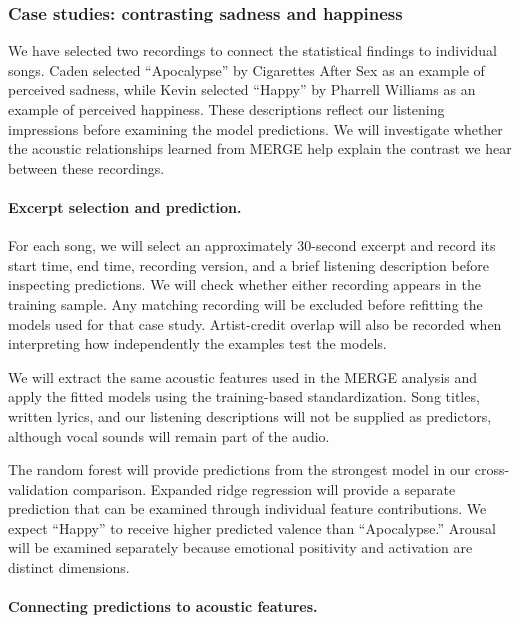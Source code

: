 \subsubsection{Case studies: contrasting sadness and happiness}
\label{sec:case_studies}

We have selected two recordings to connect the statistical findings to individual songs. Caden selected ``Apocalypse'' by Cigarettes After Sex as an example of perceived sadness, while Kevin selected ``Happy'' by Pharrell Williams as an example of perceived happiness. These descriptions reflect our listening impressions before examining the model predictions. We will investigate whether the acoustic relationships learned from MERGE help explain the contrast we hear between these recordings.

\paragraph{Excerpt selection and prediction.}

For each song, we will select an approximately 30-second excerpt and record its start time, end time, recording version, and a brief listening description before inspecting predictions. We will check whether either recording appears in the training sample. Any matching recording will be excluded before refitting the models used for that case study. Artist-credit overlap will also be recorded when interpreting how independently the examples test the models.

We will extract the same acoustic features used in the MERGE analysis and apply the fitted models using the training-based standardization. Song titles, written lyrics, and our listening descriptions will not be supplied as predictors, although vocal sounds will remain part of the audio.

The random forest will provide predictions from the strongest model in our cross-validation comparison. Expanded ridge regression will provide a separate prediction that can be examined through individual feature contributions. We expect ``Happy'' to receive higher predicted valence than ``Apocalypse.'' Arousal will be examined separately because emotional positivity and activation are distinct dimensions.

\paragraph{Connecting predictions to acoustic features.}


